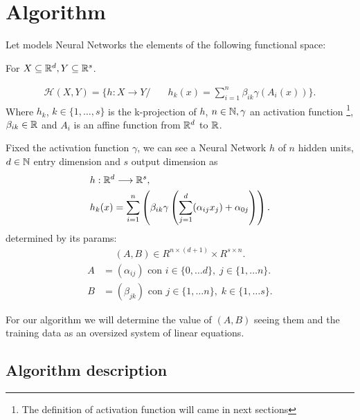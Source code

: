 \section*{Algorithm} 


Let  models Neural Networks the elements of the following functional space: 

    For $X \subseteq \mathbb{R}^d, Y \subseteq \mathbb{R}^s$. 

    \begin{align} \label{nn_functional_space}
        \mathcal{H}(X,Y) 
        =
        \{
            h : X \longrightarrow Y 
            /& \quad 
            h_k(x) = 
            \sum_{i=1}^{n} \beta_{i k} \gamma( A_{i}(x))          
        \}.
    \end{align}
    Where $h_k$, $k \in \{1, \ldots, s\}$ is the k-projection of $h$, 
    $n \in \mathbb{N},\gamma$ an activation function 
    \footnote{The definition of activation function will came in next sections }, $\beta_{i k} \in \mathbb{R}$ and $A_{i}$ is an affine function from $\mathbb{R}^d$ to $\mathbb{R}$. 

  Fixed the activation function 
$\gamma$, we can see a Neural Network $h$ of $n$ hidden 
units, $d \in \mathbb{N}$ entry dimension and $s$ output
dimension as 
\begin{align}
    &h: \mathbb{R}^d \longrightarrow \mathbb{R}^s,\\
    &h_k(x) = \sum_{i= 1}^n 
        \left(
            \beta_{i k} 
            \gamma
            \left( 
                \sum_{j = 1}^d
                (
                    \alpha_{i j} x_j
                ) + \alpha_{0 j}
            \right)
        \right).
\end{align}
determined by its params: 
\begin{align}
    (A,B) \in R^{n \times (d+1)} \times R^{s \times n}.
\end{align} 
\begin{align*}\label{eq:representation red neuronal}
    A &= (\alpha_{i j}) \text{ con }  i \in \{0, \ldots d\}, \; j \in \{1, \ldots n\}. \\
    B &= (\beta_{j k}) \text{ con }  j \in \{1, \ldots n\}, \; k \in \{1, \ldots s\}.
\end{align*}

For our algorithm we will determine the value of 
$(A,B)$ seeing them and the training data as an oversized system of linear equations. 

\subsection*{Algorithm description}  

